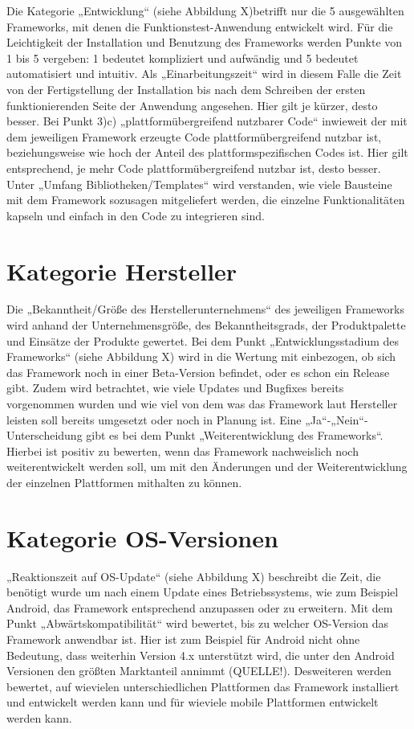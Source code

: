 Die Kategorie „Entwicklung“ (siehe Abbildung X)betrifft nur die 5 ausgewählten Frameworks, mit denen die Funktionstest-Anwendung entwickelt wird. Für die Leichtigkeit der Installation und Benutzung des Frameworks werden Punkte von 1 bis 5 vergeben: 1 bedeutet kompliziert und aufwändig und 5 bedeutet automatisiert und intuitiv. Als „Einarbeitungszeit“ wird in diesem Falle die Zeit von der Fertigstellung der Installation bis nach dem Schreiben der ersten funktionierenden Seite der Anwendung angesehen. Hier gilt je kürzer, desto besser. Bei Punkt 3)c) „plattformübergreifend nutzbarer Code“ inwieweit der mit dem jeweiligen Framework erzeugte Code plattformübergreifend nutzbar ist, beziehungsweise wie hoch der Anteil des plattformspezifischen Codes ist. Hier gilt entsprechend, je mehr Code plattformübergreifend nutzbar ist, desto besser. Unter „Umfang Bibliotheken/Templates“ wird verstanden, wie viele Bausteine mit dem Framework sozusagen mitgeliefert werden, die einzelne Funktionalitäten kapseln und einfach in den Code zu integrieren sind.

\section{Kategorie Hersteller}

Die „Bekanntheit/Größe des Herstellerunternehmens“ des jeweiligen Frameworks wird anhand der Unternehmensgröße, des Bekanntheitsgrads, der Produktpalette und Einsätze der Produkte gewertet. Bei dem Punkt „Entwicklungsstadium des Frameworks“ (siehe Abbildung X) wird in die Wertung mit einbezogen, ob sich das Framework noch in einer Beta-Version befindet, oder es schon ein Release gibt. Zudem wird betrachtet, wie viele Updates und Bugfixes bereits vorgenommen wurden und wie viel von dem was das Framework laut Hersteller leisten soll bereits umgesetzt oder noch in Planung ist. Eine „Ja“-„Nein“-Unterscheidung gibt es bei dem Punkt „Weiterentwicklung des Frameworks“. Hierbei ist positiv zu bewerten, wenn das Framework nachweislich noch weiterentwickelt werden soll, um mit den Änderungen und der Weiterentwicklung der einzelnen Plattformen mithalten zu können.

\section{Kategorie OS-Versionen}

„Reaktionszeit auf OS-Update“ (siehe Abbildung X) beschreibt die Zeit, die benötigt wurde um nach einem Update eines Betriebssystems, wie zum Beispiel Android, das Framework entsprechend anzupassen oder zu erweitern. Mit dem Punkt „Abwärtskompatibilität“ wird bewertet, bis zu welcher OS-Version das Framework anwendbar ist. Hier ist zum Beispiel für Android nicht ohne Bedeutung, dass weiterhin Version 4.x unterstützt wird, die unter den Android Versionen den größten Marktanteil annimmt (QUELLE!). Desweiteren werden bewertet, auf wievielen unterschiedlichen Plattformen das Framework installiert und entwickelt werden kann und für wieviele mobile Plattformen entwickelt werden kann. 

